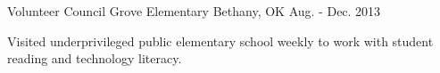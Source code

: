 

\begin{cventries}

  \cventry
    {Volunteer} %
    {Council Grove Elementary} %
    {Bethany, OK} %
    {Aug. - Dec. 2013} %
    {
      \begin{cvitems} %
        \item {Visited underprivileged public elementary school weekly to work with student reading and technology literacy.}
      \end{cvitems}
    }


\end{cventries}
